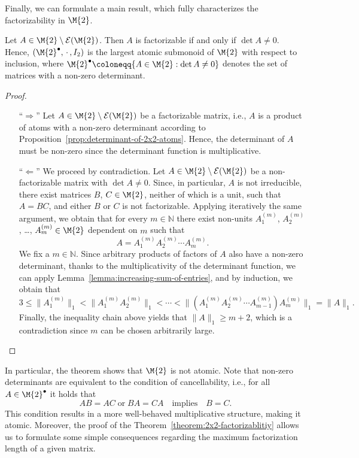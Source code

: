 Finally, we can formulate a main result, which fully characterizes the factorizability in $\M{2}$.

\begin{theorem}\label{theorem:2x2-factorizablitiy}
Let $A \in \M{2}\setminus\mathcal{E}(\M{2})$. Then $A$ is factorizable if and only if $\det{A} \neq 0$. Hence, $({\M{2}}^\bullet,\,\cdot\,,I_2)$ is the largest atomic submonoid of $\M{2}$ with respect to inclusion, where ${\M{2}}^\bullet \coloneqq \{ A \in \M{2}: \det{A} \neq 0 \}$ denotes the set of matrices with a non-zero determinant.
\end{theorem}

\begin{proof}
\begin{itemize}
\item[``$\Rightarrow$'']  Let $A \in \M{2}\setminus\mathcal{E}(\M{2})$ be a factorizable matrix, i.e., $A$ is a product of atoms with a non-zero determinant according to Proposition~\ref{prop:determinant-of-2x2-atoms}. Hence, the determinant of $A$ must be non-zero since the determinant function is multiplicative.
\item[``$\Leftarrow$''] We proceed by contradiction. Let $A \in \M{2}\setminus\mathcal{E}(\M{2})$ be a non-factorizable matrix with $\det{A} \neq 0$. Since, in particular, $A$ is not irreducible, there exist matrices $B$, $C \in \M{2}$, neither of which is a unit, such that $A=BC$, and either $B$ or $C$ is not factorizable. Applying iteratively the same argument, we obtain that for every $m \in \mathbb{N}$ there exist non-units $A_1^{(m)}$, $A_2^{(m)}$, \dots, $A_m^{(m)} \in \M{2}$ dependent on $m$ such that 
\[A = A_1^{(m)} A_2^{(m)}\cdots A_m^{(m)}.\]
We fix a  $m \in \mathbb{N}$. Since arbitrary products of factors of $A$ also have a non-zero determinant, thanks to the multiplicativity of the determinant function, we can apply Lemma~\ref{lemma:increasing-sum-of-entries}, and by induction, we obtain that 
\[ 3 \leq \| A_1^{(m)} \|_1 < \| A_1^{(m)}A_2^{(m)} \|_1 < \cdots < \| (A_1^{(m)}A_2^{(m)}\cdots A_{m-1}^{(m)})A_{m}^{(m)} \|_1 = \| A \|_1. \]
Finally, the inequality chain above yields that $\| A \|_1 \geq m + 2$, which is a contradiction since $m$ can be chosen arbitrarily large.
\end{itemize}
\end{proof}

In particular, the theorem shows that $\M{2}$ is not atomic. Note that non-zero determinants are equivalent to the condition of cancellability, i.e., for all $A \in {\M{2}}^\bullet$ it holds that
\[  AB = AC \;\text{or}\; BA = CA \quad \text{implies} \quad B=C. \]
This condition results in a more well-behaved multiplicative structure, making it atomic. Moreover, the proof of the Theorem~\ref{theorem:2x2-factorizablitiy} allows us to formulate some simple consequences regarding the maximum factorization length of a given matrix.

